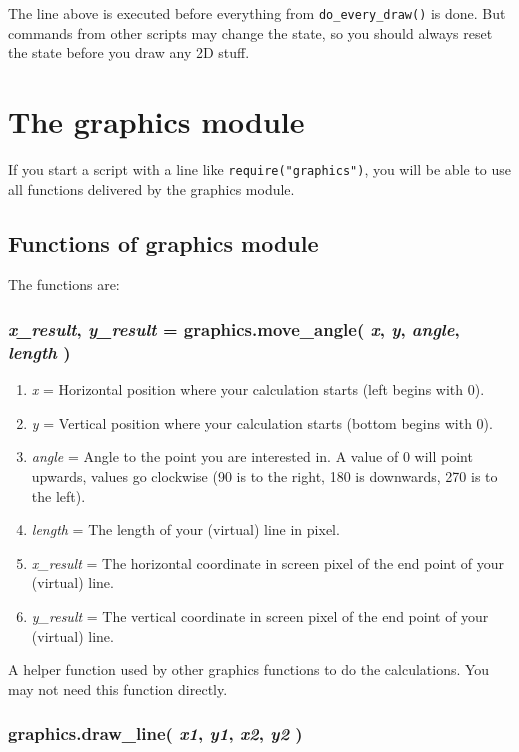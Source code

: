 \documentclass[11pt,parskip=half,a4paper]{scrartcl}
\begin{document}
The line above is executed before everything from \verb|do_every_draw()| is done. But commands from other scripts may change the state, so you should always reset the state before you draw any 2D stuff.

\newpage
\section{The graphics module}

If you start a script with a line like \verb|require("graphics")|, you will be able to use all functions delivered by the graphics module. 

\subsection{Functions of graphics module}

The functions are:

\subsubsection{\emph{x\_result}, \emph{y\_result} = graphics.move\_angle( \emph{x}, \emph{y}, \emph{angle}, \emph{length} )}

\begin{enumerate}
	\item \emph{x} = Horizontal position where your calculation starts (left begins with 0).
	\item \emph{y} = Vertical position where your calculation starts (bottom begins with 0).
	\item \emph{angle} = Angle to the point you are interested in. A value of 0 will point upwards, values go clockwise (90 is to the right, 180 is downwards, 270 is to the left).
	\item \emph{length} = The length of your (virtual) line in pixel.
	\item \emph{x\_result} = The horizontal coordinate in screen pixel of the end point of your (virtual) line.
	\item \emph{y\_result} = The vertical coordinate in screen pixel of the end point of your (virtual) line.
\end{enumerate}

A helper function used by other graphics functions to do the calculations. You may not need this function directly.

\subsubsection{graphics.draw\_line( \emph{x1}, \emph{y1}, \emph{x2}, \emph{y2} )}
\end{document}

